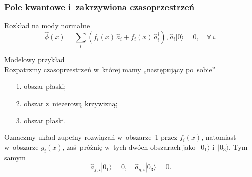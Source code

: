 \documentclass[10pt,t]{beamer}
\begin{document}
\begin{frame}
  \frametitle{Pole kwantowe i~zakrzywiona czasoprzestrzeń}


  Rozkład na mody normalne \\
  \begin{subequations}
    \begin{equation}
      \label{eq:Promieniowanie-Hawkinga-09a}
      \widehat{ \phi }( x ) =
      \sum_{ i }( f_{ i }( x )\, \widehat{ a }_{ i }
      + \bar{ f }_{ i }( x )\, \widehat{ a }^{ \dagger }_{ i } ),
    \end{equation}
    \begin{equation}
      \label{eq:Promieniowanie-Hawkinga-09b}
      \widehat{ a }_{ i }| 0 \rangle = 0, \quad \forall\, i.
    \end{equation}
  \end{subequations}

  Modelowy przykład \\
  Rozpatrzmy czasoprzestrzeń w~której mamy „następujący po~sobie”
  \begin{itemize}
    \RaggedRight

  \item[1.] obszar płaski;

  \item[2.] obszar z~niezerową krzywizną;

  \item[3.] obszar płaski.

  \end{itemize}

  Oznaczmy układ zupełny rozwiązań w~obszarze~1 przez
  $f_{ i }( x )$, natomiast w~obszarze $g_{ i }( x )$, zaś~próżnię
  w~tych dwóch obszarach jako~$| 0_{ 1 } \rangle$
  i~$| 0_{ 3 } \rangle$. Tym samym
  \begin{equation}
    \label{eq:Promieniowanie-Hawkinga-10}
    \widehat{ a }_{ f, i } | 0_{ 1 } \rangle = 0, \quad
    \widehat{ a }_{ g, i } | 0_{ 3 } \rangle = 0.
  \end{equation}

\end{frame}
\end{document}
